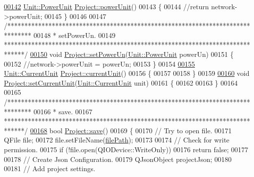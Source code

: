 \begin{DoxyCode}
\hypertarget{project_8cpp_source_l00142}{}\hyperlink{class_project_a2a1bc35358d6189695d6e5b7dd547ffd}{00142} \hyperlink{class_unit_ace265ae255370ccacfd5370337572c3b}{Unit::PowerUnit} \hyperlink{class_project_a2a1bc35358d6189695d6e5b7dd547ffd}{Project::powerUnit}()
00143 \{
00144   \textcolor{comment}{//return network->powerUnit;}
00145 \}
00146 
00147 \textcolor{comment}{/*******************************************************************************}
00148 \textcolor{comment}{ * setPowerUn.}
00149 \textcolor{comment}{ ******************************************************************************/}
\hypertarget{project_8cpp_source_l00150}{}\hyperlink{class_project_aa46b8645d2047c1a2e8d329b9ebbc120}{00150} \textcolor{keywordtype}{void} \hyperlink{class_project_aa46b8645d2047c1a2e8d329b9ebbc120}{Project::setPowerUn}(\hyperlink{class_unit_ace265ae255370ccacfd5370337572c3b}{Unit::PowerUnit} powerUn)
00151 \{
00152   \textcolor{comment}{//network->powerUnit = powerUn;}
00153 \}
00154 
\hypertarget{project_8cpp_source_l00155}{}\hyperlink{class_project_a0d22341fcc068be743b776df0a02f55e}{00155} \hyperlink{class_unit_a0794cf6c9682f48296dd4a5315389787}{Unit::CurrentUnit} \hyperlink{class_project_a0d22341fcc068be743b776df0a02f55e}{Project::currentUnit}()
00156 \{
00157 
00158 \}
00159 
\hypertarget{project_8cpp_source_l00160}{}\hyperlink{class_project_a64d9800bc3acafcfa4d3f45ee5aacc6d}{00160} \textcolor{keywordtype}{void} \hyperlink{class_project_a64d9800bc3acafcfa4d3f45ee5aacc6d}{Project::setCurrentUnit}(\hyperlink{class_unit_a0794cf6c9682f48296dd4a5315389787}{Unit::CurrentUnit} unit)
00161 \{
00162 
00163 \}
00164 
00165 \textcolor{comment}{/*******************************************************************************}
00166 \textcolor{comment}{ * save.}
00167 \textcolor{comment}{ ******************************************************************************/}
\hypertarget{project_8cpp_source_l00168}{}\hyperlink{class_project_a596a875bc5be73bc5b1b71b6448c1e07}{00168} \textcolor{keywordtype}{bool} \hyperlink{class_project_a596a875bc5be73bc5b1b71b6448c1e07}{Project::save}()
00169 \{
00170   \textcolor{comment}{// Try to open file.}
00171   QFile file;
00172   file.setFileName(\hyperlink{class_project_a79f30adcefd0b72bd4ac7db724bc9531}{filePath});
00173 
00174   \textcolor{comment}{// Check for write permission.}
00175   \textcolor{keywordflow}{if} (!file.open(QIODevice::WriteOnly))
00176     \textcolor{keywordflow}{return} \textcolor{keyword}{false};
00177 
00178   \textcolor{comment}{// Create Json Configuration.}
00179   QJsonObject projectJson;
00180 
00181   \textcolor{comment}{// Add project settings.}

\end{DoxyCode}
